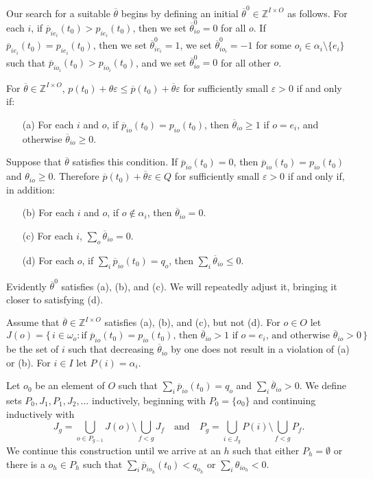 \documentclass[12pt]{article}
\theoremstyle{definition}
\newcommand{\In}{\mathbb{Z}}
\newcommand{\barp}{\overline{p}}
\newcommand{\bartheta}{{\overline \theta}}
\newcommand{\varep}{\varepsilon}
\begin{document}
\begin{appendix}
Our search for a suitable $\bartheta$ begins by defining an initial
$\bartheta^0 \in \In^{I \times O}$ as follows.  For each $i$, if
$\barp_{ie_i}(t_0) > p_{ie_i}(t_0)$, then we set $\bartheta^0_{io} =
0$ for all $o$.  If $\barp_{ie_i}(t_0) = p_{ie_i}(t_0)$, then we set
$\bartheta^0_{ie_i} = 1$, we set $\bartheta^0_{io_i} = -1$ for some
$o_i \in \alpha_i \setminus \{e_i\}$ such that $\barp_{io_i}(t_0) >
p_{io_i}(t_0)$, and we set $\bartheta^0_{io} = 0$ for all other $o$.


For $\bartheta \in \In^{I \times O}$, $p(t_0) + \theta \varep \le
\barp(t_0) + \bartheta \varep$ for sufficiently small $\varep > 0$ if
and only if:
\begin{enumerate}  
  \item[(a)] For each $i$ and $o$, if $\barp_{io}(t_0) = p_{io}(t_0)$, then
        $\bartheta_{io} \ge 1$ if $o = e_i$, and otherwise
        $\bartheta_{io} \ge 0$.
\end{enumerate}
Suppose that $\bartheta$ satisfies this condition.  If
$\barp_{io}(t_0) = 0$, then $\barp_{io}(t_0) = p_{io}(t_0)$ and
$\theta_{io} \ge 0$.  Therefore $\barp(t_0) + \bartheta \varep \in Q$
for sufficiently small $\varep > 0$ if and only if, in addition:
\begin{enumerate} 
  \item[(b)] For each $i$ and $o$, if $o \notin \alpha_i$, then $\bartheta_{io} = 0$.
  \item[(c)] For each $i$, $\sum_o \bartheta_{io} = 0$.
  \item[(d)] For each $o$, if $\sum_i \barp_{io}(t_0) = q_o$, then $\sum_i \bartheta_{io} \le 0$.
\end{enumerate}

Evidently $\bartheta^0$ satisfies (a), (b), and (c).  We will
repeatedly adjust it, bringing it closer to satisfying (d).

Assume that $\bartheta \in \In^{I \times O}$ satisfies (a), (b), and
(c), but not (d).  For $o \in O$ let
$$J(o) = \{\, i \in \omega_o : \text{if $\barp_{io}(t_0) =
  p_{io}(t_0)$, then $\bartheta_{io} > 1$ if $o = e_i$, and otherwise
  $\bartheta_{io} > 0$} \,\}$$ be the set of $i$ such that decreasing
$\bartheta_{io}$ by one does not result in a violation of (a) or (b).
For $i \in I$ let $P(i) = \alpha_i$.

Let $o_0$ be an element of $O$ such that $\sum_i \barp_{io}(t_0) =
q_o$ and $\sum_i \bartheta_{io} > 0$.  We define sets $P_0, J_1, P_1,
J_2, \ldots$ inductively, beginning with $P_0 = \{o_0\}$ and
continuing inductively with $$J_g = \bigcup_{o \in P_{g-1}} J(o)
\setminus \bigcup_{f < g} J_f \quad \text{and} \quad P_g = \bigcup_{i
  \in J_g} P(i) \setminus \bigcup_{f < g} P_f.$$ We continue this
construction until we arrive at an $h$ such that either $P_h =
\emptyset$ or there is a $o_h \in P_h$ such that $\sum_i
\barp_{io_h}(t_0) < q_{o_h}$ or $\sum_i \theta_{io_h} < 0$.


\end{appendix}
\end{document}
